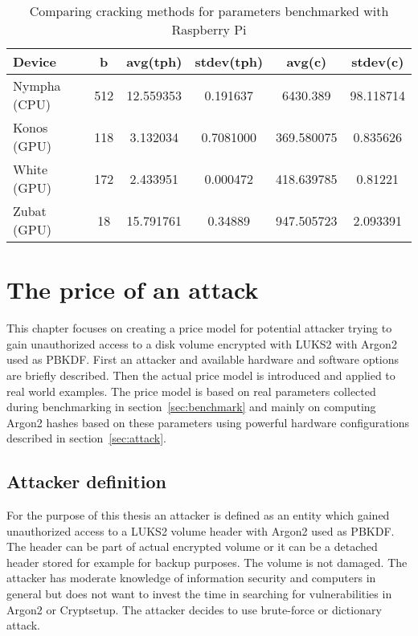 \documentclass[nolof]{fithesis3}
\begin{document}
\noindent
\begin{table}
\caption{Comparing cracking methods for parameters benchmarked with Raspberry Pi}
\label{tab:rpicrack}
\begin{tabularx}{\textwidth}{| l | c | c | c | c | c |}
\hline
Device & b & avg(tph) & stdev(tph) & avg(c) & stdev(c)\\
\hline
Nympha (CPU) & 512 & 12.559353 & 0.191637 & 6430.389 & 98.118714\\
\hline
Konos (GPU) & 118 & 3.132034 & 0.7081000 & 369.580075 & 0.835626\\
\hline
White (GPU) & 172 & 2.433951 & 0.000472 & 418.639785 & 0.81221\\
\hline
Zubat (GPU) & 18 & 15.791761 & 0.34889 & 947.505723 & 2.093391\\
\hline
\end{tabularx}
\end{table}



\chapter{The price of an attack}
\label{chap:model}
This chapter focuses on creating a price model for potential attacker trying to gain unauthorized access to a disk volume encrypted with LUKS2 with Argon2 used as PBKDF. First an attacker and available hardware and software options are briefly described. Then the actual price model is introduced and applied to real world examples. The price model is based on real parameters collected during benchmarking in section~\ref{sec:benchmark} and mainly on computing Argon2 hashes based on these parameters using powerful hardware configurations described in section~\ref{sec:attack}.

\section{Attacker definition}
\label{sec:attacker}
For the purpose of this thesis an attacker is defined as an entity which gained unauthorized access to a LUKS2 volume header with Argon2 used as PBKDF. The header can be part of actual encrypted volume or it can be a detached header stored for example for backup purposes. The volume is not damaged. The attacker has moderate knowledge of information security and computers in general but does not want to invest the time in searching for vulnerabilities in Argon2 or Cryptsetup. The attacker decides to use brute-force or dictionary attack.
\end{document}
